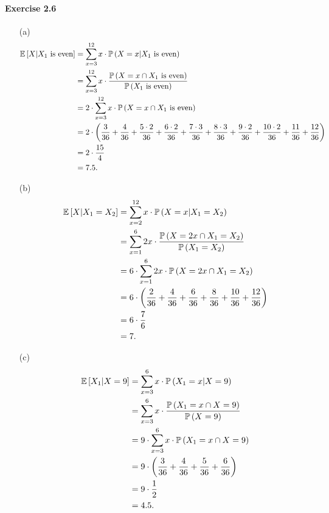 \paragraph{Exercise 2.6}
\begin{enumerate}
  \item[(a)]
    \begin{align*}
      \mathbb{E}\left[ X | X_1 \text{ is even} \right]
        &= \sum_{x=3}^{12} x \cdot \mathbb{P}\left( X = x | X_1 \text{ is even} \right) \\
        &= \sum_{x=3}^{12} x \cdot \frac{\mathbb{P}\left( X = x \cap X_1 \text{ is even} \right)}{\mathbb{P}\left( X_1 \text{ is even} \right)} \\
        &= 2 \cdot \sum_{x=3}^{12} x \cdot \mathbb{P}\left( X = x \cap X_1 \text{ is even} \right) \\
        &= 2 \cdot \left( \frac{3}{36} + \frac{4}{36} + \frac{5 \cdot 2}{36} + \frac{6 \cdot 2}{36} + \frac{7 \cdot 3}{36} + \frac{8 \cdot 3}{36} + \frac{9 \cdot 2}{36} + \frac{10 \cdot 2}{36} + \frac{11}{36} + \frac{12}{36} \right) \\
        &= 2 \cdot \frac{15}{4} \\
        &= 7.5.
    \end{align*}

  \item[(b)]
    \begin{align*}
      \mathbb{E}\left[ X | X_1 = X_2 \right]
        &= \sum_{x=2}^{12} x \cdot \mathbb{P}\left( X = x | X_1 = X_2 \right) \\
        &= \sum_{x=1}^{6} 2x \cdot \frac{\mathbb{P}\left( X = 2x \cap X_1 = X_2 \right)}{\mathbb{P}\left( X_1 = X_2 \right)} \\
        &= 6 \cdot \sum_{x=1}^{6} 2x \cdot \mathbb{P}\left( X = 2x \cap X_1 = X_2 \right) \\
        &= 6 \cdot \left( \frac{2}{36} + \frac{4}{36} + \frac{6}{36} + \frac{8}{36} + \frac{10}{36} + \frac{12}{36} \right) \\
        &= 6 \cdot \frac{7}{6} \\
        &= 7.
    \end{align*}

  \item[(c)]
    \begin{align*}
      \mathbb{E}\left[ X_1 | X = 9 \right]
        &= \sum_{x=3}^{6} x \cdot \mathbb{P}\left( X_1 = x | X = 9 \right) \\
        &= \sum_{x=3}^{6} x \cdot \frac{\mathbb{P}\left( X_1 = x \cap X = 9 \right)}{\mathbb{P}\left( X = 9 \right)} \\
        &= 9 \cdot \sum_{x=3}^{6} x \cdot \mathbb{P}\left( X_1 = x \cap X = 9 \right) \\
        &= 9 \cdot \left( \frac{3}{36} + \frac{4}{36} + \frac{5}{36} + \frac{6}{36} \right) \\
        &= 9 \cdot \frac{1}{2} \\
        &= 4.5.
    \end{align*}


\end{enumerate}
